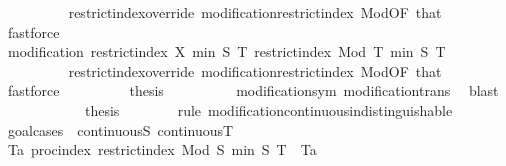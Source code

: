 \begin{isabellebody}
\ \ \ \ \ \ \ \ \isamarkupfalse%
\ restrict{\isacharunderscore}{\kern0pt}index{\isacharunderscore}{\kern0pt}override\ modification{\isacharunderscore}{\kern0pt}restrict{\isacharunderscore}{\kern0pt}index\ Mod{\isacharbrackleft}{\kern0pt}OF\ that{\isacharparenleft}{\kern0pt}{}{\isacharparenright}{\kern0pt}{\isacharbrackright}{\kern0pt}\ \isamarkupfalse%
\ fastforce\isanewline
\ \ \ \ \ \ \isamarkupfalse%
\ \isamarkupfalse%
\ {\isachardoublequoteopen}modification\ {\isacharparenleft}{\kern0pt}restrict{\isacharunderscore}{\kern0pt}index\ X\ {\isacharbraceleft}{\kern0pt}{}{\isachardot}{\kern0pt}{\isachardot}{\kern0pt}min\ S\ T{\isacharbraceright}{\kern0pt}{\isacharparenright}{\kern0pt}\ {\isacharparenleft}{\kern0pt}restrict{\isacharunderscore}{\kern0pt}index\ {\isacharparenleft}{\kern0pt}Mod\ T{\isacharparenright}{\kern0pt}\ {\isacharbraceleft}{\kern0pt}{}{\isachardot}{\kern0pt}{\isachardot}{\kern0pt}min\ S\ T{\isacharbraceright}{\kern0pt}{\isacharparenright}{\kern0pt}{\isachardoublequoteclose}\isanewline
\ \ \ \ \ \ \ \ \isamarkupfalse%
\ restrict{\isacharunderscore}{\kern0pt}index{\isacharunderscore}{\kern0pt}override\ modification{\isacharunderscore}{\kern0pt}restrict{\isacharunderscore}{\kern0pt}index\ Mod{\isacharbrackleft}{\kern0pt}OF\ that{\isacharparenleft}{\kern0pt}{}{\isacharparenright}{\kern0pt}{\isacharbrackright}{\kern0pt}\ \isamarkupfalse%
\ fastforce\isanewline
\ \ \ \ \ \ \isamarkupfalse%
\ \isamarkupfalse%
\ {\isacharquery}{\kern0pt}thesis\isanewline
\ \ \ \ \ \ \ \ \isamarkupfalse%
\ modification{\isacharunderscore}{\kern0pt}sym\ modification{\isacharunderscore}{\kern0pt}trans\ \isamarkupfalse%
\ blast\isanewline
\ \ \ \ \isamarkupfalse%
\isanewline
\ \ \ \ \isamarkupfalse%
\ \isamarkupfalse%
\ {\isacharquery}{\kern0pt}thesis\isanewline
\ \ \ \ \ \ \isamarkupfalse%
\ {\isacharparenleft}{\kern0pt}rule\ modification{\isacharunderscore}{\kern0pt}continuous{\isacharunderscore}{\kern0pt}indistinguishable{\isacharparenright}{\kern0pt}\isanewline
\ \ \ \ \isamarkupfalse%
\ {\isacharparenleft}{\kern0pt}goal{\isacharunderscore}{\kern0pt}cases\ {\isacharunderscore}{\kern0pt}\ continuous{\isacharunderscore}{\kern0pt}S\ continuous{\isacharunderscore}{\kern0pt}T{\isacharparenright}{\kern0pt}\isanewline
\ \ \ \ \ \isamarkupfalse%
\ {\isachardoublequoteopen}{\isasymexists}Ta{\isachargreater}{\kern0pt}{}{\isachardot}{\kern0pt}\ proc{\isacharunderscore}{\kern0pt}index\ {\isacharparenleft}{\kern0pt}restrict{\isacharunderscore}{\kern0pt}index\ {\isacharparenleft}{\kern0pt}Mod\ S{\isacharparenright}{\kern0pt}\ {\isacharbraceleft}{\kern0pt}{}{\isachardot}{\kern0pt}{\isachardot}{\kern0pt}min\ S\ T{\isacharbraceright}{\kern0pt}{\isacharparenright}{\kern0pt}\ {\isacharequal}{\kern0pt}\ {\isacharbraceleft}{\kern0pt}{}{\isachardot}{\kern0pt}{\isachardot}{\kern0pt}Ta{\isacharbraceright}{\kern0pt}{\isachardoublequoteclose}\isanewline

\end{isabellebody}
